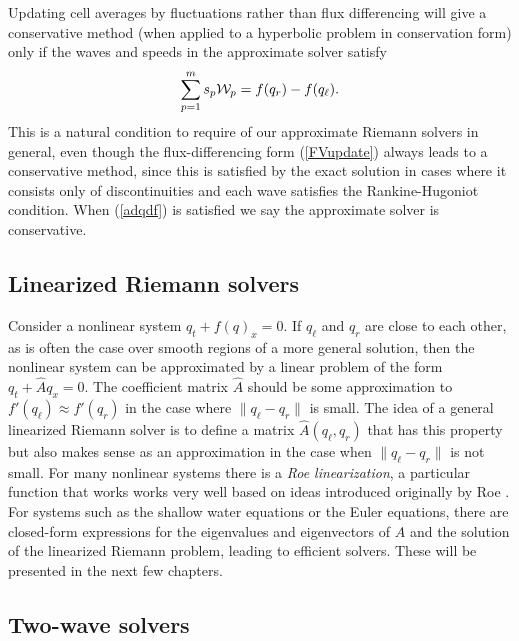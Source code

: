 \documentclass[11pt]{article}
\begin{document}
Updating cell averages by fluctuations rather than flux differencing
will give a conservative method (when applied to a hyperbolic problem in
conservation form) only if the waves and speeds in the approximate
solver satisfy \begin{align}
\label{adqdf}
\sum_{p=1}^m s_p {\cal W}_p = f(q_r) - f(q_\ell).
\end{align} This is a natural condition to require of our approximate
Riemann solvers in general, even though the flux-differencing form
(\ref{FVupdate}) always leads to a conservative method, since this is
satisfied by the exact solution in cases where it consists only of
discontinuities and each wave satisfies the Rankine-Hugoniot condition.
When (\ref{adqdf}) is satisfied we say the approximate solver is
conservative.

    \hypertarget{linearized-riemann-solvers}{%
\subsection{Linearized Riemann
solvers}\label{linearized-riemann-solvers}}

Consider a nonlinear system \(q_t + f(q)_x = 0\). If \(q_\ell\) and
\(q_r\) are close to each other, as is often the case over smooth
regions of a more general solution, then the nonlinear system can be
approximated by a linear problem of the form \(q_t + \hat A q_x = 0\).
The coefficient matrix \(\hat A\) should be some approximation to
\(f'(q_\ell) \approx f'(q_r)\) in the case where \(\|q_\ell-q_r\|\) is
small. The idea of a general linearized Riemann solver is to define a
matrix \(\hat A(q_\ell, q_r)\) that has this property but also makes
sense as an approximation in the case when \(\|q_\ell-q_r\|\) is not
small. For many nonlinear systems there is a \emph{Roe linearization}, a
particular function that works works very well based on ideas introduced
originally by Roe \cite{Roe1981}. For systems such as the shallow water
equations or the Euler equations, there are closed-form expressions for
the eigenvalues and eigenvectors of \(\hat A\) and the solution of the
linearized Riemann problem, leading to efficient solvers. These will be
presented in the next few chapters.

    \hypertarget{two-wave-solvers}{%
\subsection{Two-wave solvers}\label{two-wave-solvers}}
\end{document}
